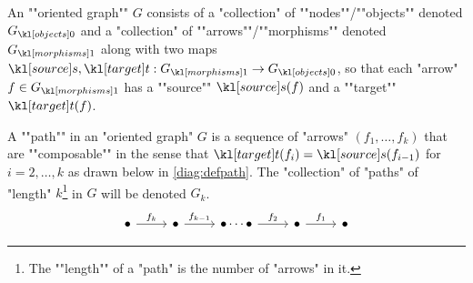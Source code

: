 \documentclass[main.tex]{subfiles}
\begin{document}
\begin{defn}
	\AP An ""oriented graph"" $G$ consists of a "collection" of ""nodes""/""objects"" denoted $\obj{G}$ and a "collection" of ""arrows""/""morphisms"" denoted $\mor{G}$ along with \AP two maps $\source,\target: \mor{G} \rightarrow \obj{G}$, so that each "arrow" $f \in \mor{G}$ has a ""source"" $\source(f)$ and a ""target"" $\target(f)$. 
\end{defn}
\begin{defn}[Paths]
	\AP A ""path"" in an "oriented graph" $G$ is a sequence of "arrows" $(f_1, \dots, f_k)$ that are ""composable"" in the sense that $\target(f_i) = \source(f_{i-1})$ for $i=2,\dots, k$ as drawn below in \eqref{diag:defpath}. The "collection" of "paths" of "length" $k$\footnote{\AP The ""length"" of a "path" is the number of "arrows" in it.} in $G$ will be denoted $G_k$.
	\begin{equation}\label{diag:defpath}
		\begin{tikzcd}
			\bullet \arrow[r, "f_k"] & \bullet \arrow[r, "f_{k-1}"] & \bullet\cdots\bullet \arrow[r, "f_2"] & \bullet \arrow[r, "f_1"] & \bullet
		\end{tikzcd}
	\end{equation}
\end{defn}
\end{document}
